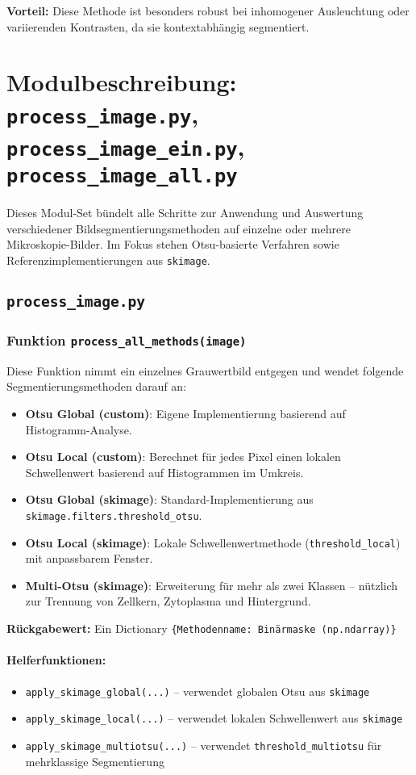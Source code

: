 \documentclass[a4paper,12pt]{article}
\begin{document}
\textbf{Vorteil:} Diese Methode ist besonders robust bei inhomogener Ausleuchtung oder variierenden Kontrasten, da sie kontextabhängig segmentiert.


\section*{ Modulbeschreibung: \texttt{process\_image.py}, \texttt{process\_image\_ein.py}, \texttt{process\_image\_all.py}}

Dieses Modul-Set bündelt alle Schritte zur Anwendung und Auswertung verschiedener Bildsegmentierungsmethoden auf einzelne oder mehrere Mikroskopie-Bilder. Im Fokus stehen Otsu-basierte Verfahren sowie Referenzimplementierungen aus \texttt{skimage}.

\subsection*{ \texttt{process\_image.py}}

\subsubsection*{Funktion \texttt{process\_all\_methods(image)}}

Diese Funktion nimmt ein einzelnes Grauwertbild entgegen und wendet folgende Segmentierungsmethoden darauf an:

\begin{itemize}
  \item \textbf{Otsu Global (custom)}: Eigene Implementierung basierend auf Histogramm-Analyse.
  \item \textbf{Otsu Local (custom)}: Berechnet für jedes Pixel einen lokalen Schwellenwert basierend auf Histogrammen im Umkreis.
  \item \textbf{Otsu Global (skimage)}: Standard-Implementierung aus \texttt{skimage.filters.threshold\_otsu}.
  \item \textbf{Otsu Local (skimage)}: Lokale Schwellenwertmethode (\texttt{threshold\_local}) mit anpassbarem Fenster.
  \item \textbf{Multi-Otsu (skimage)}: Erweiterung für mehr als zwei Klassen – nützlich zur Trennung von Zellkern, Zytoplasma und Hintergrund.
\end{itemize}

\textbf{Rückgabewert:} Ein Dictionary \texttt{\{Methodenname: Binärmaske (np.ndarray)\}}

\paragraph{Helferfunktionen:}
\begin{itemize}
  \item \texttt{apply\_skimage\_global(...)} – verwendet globalen Otsu aus \texttt{skimage}
  \item \texttt{apply\_skimage\_local(...)} – verwendet lokalen Schwellenwert aus \texttt{skimage}
  \item \texttt{apply\_skimage\_multiotsu(...)} – verwendet \texttt{threshold\_multiotsu} für mehrklassige Segmentierung
\end{itemize}
\end{document}
